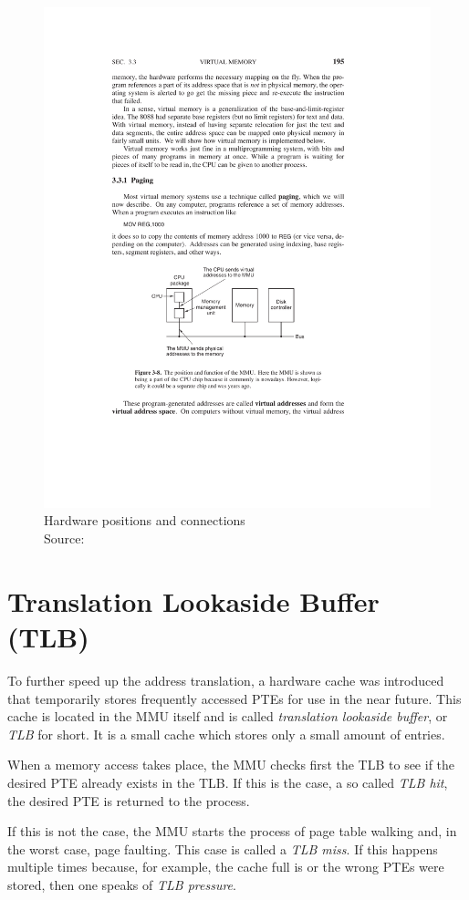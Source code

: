 \begin{figure}[H]
    \centering
    \includegraphics[width=.65\textwidth]{images/3_basics/hardware-paging.pdf}
    \caption{Hardware positions and connections\\Source: \cite{tanenbaum}}
    \label{fig:simplemmu}
\end{figure}
\vspace{-\baselineskip}

\section{Translation Lookaside Buffer (TLB)}\label{section:tlb}

To further speed up the address translation, a hardware cache was introduced that temporarily stores frequently accessed PTEs for use in the near future. This cache is located in the MMU itself and is called \textit{translation lookaside buffer}, or \textit{TLB} for short. It is a small cache which stores only a small amount of entries. \cite[p. 183]{threeeasy} \cite[p. 202]{tanenbaum}

When a memory access takes place, the MMU checks first the TLB to see if the desired PTE already exists in the TLB. If this is the case, a so called \textit{TLB hit}, the desired PTE is returned to the process. \cite[p. 184]{threeeasy} \cite[p. 203]{tanenbaum}

If this is not the case, the MMU starts the process of page table walking and, in the worst case, page faulting. This case is called a \textit{TLB miss}.  \cite[p. 184]{threeeasy} \cite[p. 204]{tanenbaum} If this happens multiple times because, for example, the cache full is or the wrong PTEs were stored, then one speaks of \textit{TLB pressure}.

